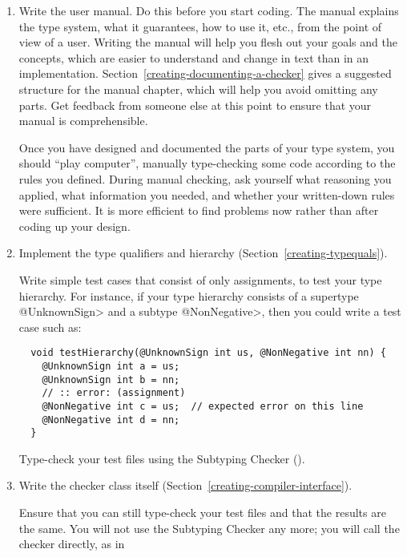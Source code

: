 \begin{enumerate}
\item
\label{creating-tips-write-manual}
  Write the user manual.  Do this before you start coding.  The manual
  explains the type system, what it guarantees, how to use it, etc., from
  the point of view of a user.  Writing the manual will help you flesh out
  your goals and the concepts, which are easier to understand and change in
  text than in an implementation.
  Section~\ref{creating-documenting-a-checker} gives a suggested structure
  for the manual chapter, which will help you avoid omitting any parts.
  Get feedback from someone else at this point to ensure that your manual
  is comprehensible.

  Once you have designed and documented the parts of your type system, you
  should ``play computer'', manually
  type-checking some code according to the rules you defined.
  During manual checking, ask
  yourself what reasoning you applied, what information you needed, and
  whether your written-down rules were sufficient.
  It is more efficient to find problems now rather than after coding up
  your design.

\item
\label{creating-tips-implement-qualifiers}
  Implement the type qualifiers and hierarchy
  (Section~\ref{creating-typequals}).

  Write simple test cases that consist of only assignments,
  to test your type hierarchy.  For instance, if
  your type hierarchy consists of a supertype \<@UnknownSign> and a subtype
  \<@NonNegative>, then you could write a test case such as:

\begin{Verbatim}
  void testHierarchy(@UnknownSign int us, @NonNegative int nn) {
    @UnknownSign int a = us;
    @UnknownSign int b = nn;
    // :: error: (assignment)
    @NonNegative int c = us;  // expected error on this line
    @NonNegative int d = nn;
  }
\end{Verbatim}

  Type-check your test files using the Subtyping Checker
  ().

\item
\label{creating-tips-implement-checker}
  Write the checker class itself
  (Section~\ref{creating-compiler-interface}).

  Ensure that you can still type-check your test files and that the results
  are the same.  You will not use the Subtyping Checker any more; you will
  call the checker directly, as in


\end{enumerate}
